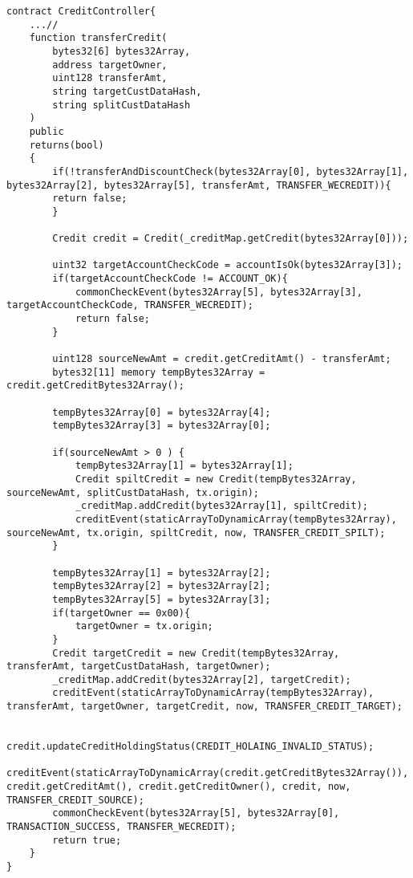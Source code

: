 \documentclass[varwidth=20cm]{standalone}
\begin{document}
         
\begin{verbatim}
contract CreditController{
	...// 
	function transferCredit(
		bytes32[6] bytes32Array,
		address targetOwner,
		uint128 transferAmt,
		string targetCustDataHash,
		string splitCustDataHash
	)
	public
	returns(bool)
	{
		if(!transferAndDiscountCheck(bytes32Array[0], bytes32Array[1], bytes32Array[2], bytes32Array[5], transferAmt, TRANSFER_WECREDIT)){
		return false;
	    }
	
		Credit credit = Credit(_creditMap.getCredit(bytes32Array[0]));
		
		uint32 targetAccountCheckCode = accountIsOk(bytes32Array[3]);
		if(targetAccountCheckCode != ACCOUNT_OK){
			commonCheckEvent(bytes32Array[5], bytes32Array[3], targetAccountCheckCode, TRANSFER_WECREDIT);
			return false;
		}
		
		uint128 sourceNewAmt = credit.getCreditAmt() - transferAmt;
		bytes32[11] memory tempBytes32Array = credit.getCreditBytes32Array();
		
		tempBytes32Array[0] = bytes32Array[4];
		tempBytes32Array[3] = bytes32Array[0];
		
		if(sourceNewAmt > 0 ) {
			tempBytes32Array[1] = bytes32Array[1];
			Credit spiltCredit = new Credit(tempBytes32Array, sourceNewAmt, splitCustDataHash, tx.origin);
			_creditMap.addCredit(bytes32Array[1], spiltCredit);
			creditEvent(staticArrayToDynamicArray(tempBytes32Array), sourceNewAmt, tx.origin, spiltCredit, now, TRANSFER_CREDIT_SPILT);
		}
		
		tempBytes32Array[1] = bytes32Array[2];
		tempBytes32Array[2] = bytes32Array[2];
		tempBytes32Array[5] = bytes32Array[3];
		if(targetOwner == 0x00){
			targetOwner = tx.origin;
		}
		Credit targetCredit = new Credit(tempBytes32Array, transferAmt, targetCustDataHash, targetOwner);
		_creditMap.addCredit(bytes32Array[2], targetCredit);
		creditEvent(staticArrayToDynamicArray(tempBytes32Array), transferAmt, targetOwner, targetCredit, now, TRANSFER_CREDIT_TARGET);
		
		credit.updateCreditHoldingStatus(CREDIT_HOLAING_INVALID_STATUS);
		creditEvent(staticArrayToDynamicArray(credit.getCreditBytes32Array()), credit.getCreditAmt(), credit.getCreditOwner(), credit, now, TRANSFER_CREDIT_SOURCE);
		commonCheckEvent(bytes32Array[5], bytes32Array[0], TRANSACTION_SUCCESS, TRANSFER_WECREDIT);
		return true;
	}
}
\end{verbatim}                                                                                       
\end{document}
